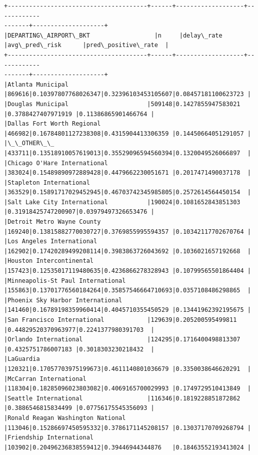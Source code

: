 \documentclass[11pt]{article}
\begin{document}
    \begin{Verbatim}[commandchars=\\\{\}]

    \end{Verbatim}

    \begin{Verbatim}[commandchars=\\\{\}]
+---------------------------------------+------+-------------------+------------
-------+--------------------+
|DEPARTING\_AIRPORT\_BKT                  |n     |delay\_rate
|avg\_pred\_risk      |pred\_positive\_rate  |
+---------------------------------------+------+-------------------+------------
-------+--------------------+
|Atlanta Municipal
|869616|0.10397807768026347|0.32396103453105607|0.08457181100623723 |
|Douglas Municipal                      |509148|0.1427855947583021
|0.3788427407971919 |0.11386865901466764 |
|Dallas Fort Worth Regional
|466982|0.16784801127238308|0.4315904413306359 |0.14450664051291057 |
|\_\_OTHER\_\_
|433711|0.13518910057619013|0.35529096594560394|0.1320049526066897  |
|Chicago O'Hare International
|383024|0.15489890972889428|0.4479662230051671 |0.2017471490037178  |
|Stapleton International
|363529|0.15891717029452945|0.46703742345985805|0.2572614564450154  |
|Salt Lake City International           |190024|0.1081652843851303
|0.31918425747200907|0.03979497326653476 |
|Detroit Metro Wayne County
|169240|0.13815882770030727|0.3769855995594357 |0.10342117702670764 |
|Los Angeles International
|162902|0.17420289499208114|0.3983863726043692 |0.1036021657192668  |
|Houston Intercontinental
|157423|0.12535017119480635|0.4236866278328943 |0.10799565501864404 |
|Minneapolis-St Paul International
|155863|0.13701776560184264|0.35857546664710693|0.0357108486298865  |
|Phoenix Sky Harbor International
|141460|0.16789198359960414|0.4045710355450529 |0.13441962392195675 |
|San Francisco International            |129639|0.205200595499811
|0.44829520370963977|0.2241377980391703  |
|Orlando International                  |124295|0.1716400498813307
|0.4325751786007183 |0.3018303230218432  |
|LaGuardia
|120321|0.17057703975199673|0.4611140801036679 |0.3350038646620291  |
|McCarran International
|118304|0.18285096023803082|0.4069165700029993 |0.1749729510413849  |
|Seattle International                  |116346|0.1819228851872862
|0.3886546815834499 |0.07756175545356093 |
|Ronald Reagan Washington National
|113046|0.15286697450595332|0.3786171145208157 |0.13037170709268794 |
|Friendship International
|103902|0.20496236838559412|0.39446944344876   |0.18463552193413024 |

\end{Verbatim}
\end{document}
